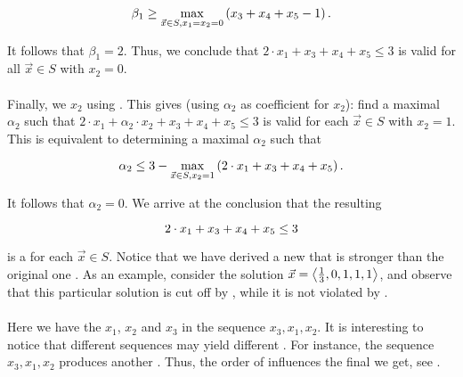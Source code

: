 \begin{example}
\begin{equation}
\beta_1\geq\max_{\vec{x}\in S,x_1=x_2=0}\left( x_3+x_4+x_5-1 \right).
\end{equation}

It follows that $\beta_1=2$. Thus, we conclude that $2\cdot x_1+x_3+x_4+x_5\leq3$ is valid for all $\vec{x}\in S$ with $x_2=0$.

\paragraph{}
Finally, we   $x_2$ using . This gives (using $\alpha_2$ as coefficient for $x_2$): find a maximal $\alpha_2$ such that $2\cdot x_1+\alpha_2\cdot x_2+x_3+x_4+x_5\leq3$ is valid for each $\vec{x}\in S$ with $x_2=1$. This is equivalent to determining a maximal $\alpha_2$ such that

\begin{equation}
\alpha_2\leq3-\max_{\vec{x}\in S,x_2 =1}\left( 2\cdot x_1+x_3+x_4+x_5 \right).
\end{equation}

It follows that $\alpha_2=0$. We arrive at the conclusion that the resulting 

\begin{equation}
2\cdot x_1+x_3+x_4+x_5\leq3\eqnlab{resultingliftingex}
\end{equation}

is a  for each $\vec{x}\in S$. Notice that we have derived a new   that is stronger than the original one . As an example, consider the solution $\vec{x}=\left\langle \frac{1}{3},0,1,1,1 \right\rangle$, and observe that this particular solution is cut off by , while it is not violated by .
\paragraph{}
Here we have  the  $x_1$, $x_2$ and $x_3$ in the sequence $x_3,x_1,x_2$. It is interesting to notice that different sequences may yield different . For instance, the sequence $x_3,x_1,x_2$ produces another . Thus, the order of  influences the final  we get, see .
\end{example}

